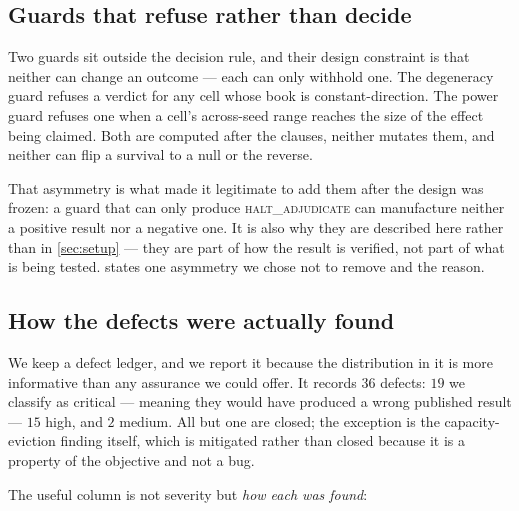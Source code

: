 \subsection{Guards that refuse rather than decide}
\label{sec:repro-guards}

Two guards sit outside the decision rule, and their design constraint is that neither can change an
outcome --- each can only withhold one. The degeneracy guard refuses a verdict for any cell whose
book is constant-direction. The power guard refuses one when a cell's across-seed range reaches the
size of the effect being claimed. Both are computed after the clauses, neither mutates them, and
neither can flip a survival to a null or the reverse.

That asymmetry is what made it legitimate to add them after the design was frozen: a guard that can
only produce \textsc{halt\_adjudicate} can manufacture neither a positive result nor a negative
one. It is also why they are described here rather than in \cref{sec:setup} --- they are part of
how the result is verified, not part of what is being tested.  states one
asymmetry we chose not to remove and the reason.

\subsection{How the defects were actually found}
\label{sec:repro-defects}

We keep a defect ledger, and we report it because the distribution in it is more informative than
any assurance we could offer. It records $36$ defects: $19$ we classify as critical --- meaning
they would have produced a wrong published result --- $15$ high, and $2$ medium. All but one are
closed; the exception is the capacity-eviction finding itself, which is mitigated rather than
closed because it is a property of the objective and not a bug.

The useful column is not severity but \emph{how each was found}:

